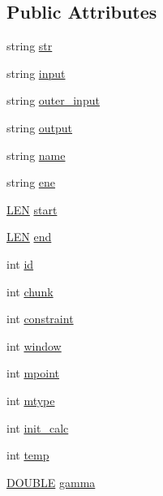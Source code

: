 \subsection*{Public Attributes}
\begin{DoxyCompactItemize}
\item 
string \hyperlink{class_rfold_1_1_arg_a10258eb45eb764844e49e5587e187af7}{str}
\item 
string \hyperlink{class_rfold_1_1_arg_a9844cbade756ff05f5c9592f17a63d95}{input}
\item 
string \hyperlink{class_rfold_1_1_arg_ae62e02353945f6073c46c27c7f583649}{outer\+\_\+input}
\item 
string \hyperlink{class_rfold_1_1_arg_a172c943d9eafc1bfc27fde48db831f5d}{output}
\item 
string \hyperlink{class_rfold_1_1_arg_a38ab74cced49339e67fe8f70bb6827fb}{name}
\item 
string \hyperlink{class_rfold_1_1_arg_a3fc1f86f5f3f7b2572392b547a2ef6a9}{ene}
\item 
\hyperlink{energy__const_8hh_a05b49c662c073f89e86804f7856622a0}{L\+E\+N} \hyperlink{class_rfold_1_1_arg_afe6c58f953e12b4964a7c14b78ee731e}{start}
\item 
\hyperlink{energy__const_8hh_a05b49c662c073f89e86804f7856622a0}{L\+E\+N} \hyperlink{class_rfold_1_1_arg_ad5641c6dff38e98a3dadb60223a4b630}{end}
\item 
int \hyperlink{class_rfold_1_1_arg_a49ec979ca116afb70aa7a25bff04d3a8}{id}
\item 
int \hyperlink{class_rfold_1_1_arg_a08a4793c210b819471f4541cc24f8859}{chunk}
\item 
int \hyperlink{class_rfold_1_1_arg_ab05512b7f96ce930ac13b873e7c298b1}{constraint}
\item 
int \hyperlink{class_rfold_1_1_arg_abf6954c2deff613f191b1fae248389f3}{window}
\item 
int \hyperlink{class_rfold_1_1_arg_a273269902f8a9b9974c1d46800df16e9}{mpoint}
\item 
int \hyperlink{class_rfold_1_1_arg_a9736867f9aac222c47efa0b5218fc8fa}{mtype}
\item 
int \hyperlink{class_rfold_1_1_arg_af97e7ba185a8a01a2d6baa5a1689f077}{init\+\_\+calc}
\item 
int \hyperlink{class_rfold_1_1_arg_a25e15defa3a3a80e6a0593989ea9e44a}{temp}
\item 
\hyperlink{energy__const_8hh_a8747af38b86aa2bbcda2f1b1aa0888c2}{D\+O\+U\+B\+L\+E} \hyperlink{class_rfold_1_1_arg_a54717ae319eecf4154dba39e42094b60}{gamma}

\end{DoxyCompactItemize}
